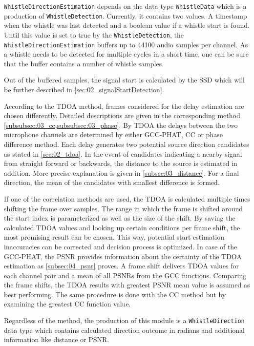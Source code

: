 \lstinline!WhistleDirectionEstimation! depends on the data type \lstinline!WhistleData!
which is a production of \lstinline!WhistleDetection!.
Currently, it contains two values. A timestamp when the whistle was last detected
and a boolean value if a whistle start is found.
Until this value is set to true by the \lstinline!WhistleDetection!, the
\lstinline!WhistleDirectionEstimation! buffers up to
44100 audio samples per channel.
As a whistle needs to be detected for multiple cycles in a short time, one can
be sure that the buffer contains a number of whistle samples.

Out of the buffered samples, the signal start is calculated by the \ac{SSD}
which will be further described in \cref{sec:02_signalStartDetection}.

According to the \ac{TDOA} method, frames considered for the delay estimation
are chosen differently.
Detailed descriptions are given in the corresponding method
\cref{subsubsec:03_cc,subsubsec:03_phase}.
By \ac{TDOA} the delays between the two microphone channels are
determined by either \ac{GCC-PHAT}, \ac{CC} or phase difference method.
Each delay generates two potential source direction candidates as stated
in \cref{sec:02_tdoa}.
In the event of candidates indicating a nearby signal from straight forward or
backwards, the distance to the source is estimated in addition.
More precise explanation is given in \cref{subsec:03_distance}.
For a final direction, the mean of the candidates with smallest difference
is formed.

If one of the correlation methods are used, the \ac{TDOA} is calculated
multiple times shifting the frame over samples.
The range in which the frame is shifted around the start index is parameterized
as well as the size of the shift.
By saving the calculated \ac{TDOA} values and looking up certain conditions per frame shift,
the most promising result can be chosen.
This way, potential start estimation inaccuracies can be corrected and
decision process is optimized.
In case of the \ac{GCC-PHAT}, the \ac{PSNR} provides information about
the certainty of the \ac{TDOA} estimation as \cref{subsec:04_psnr} proves.
A frame shift delivers \ac{TDOA} values for each channel pair and a
mean of all \acp{PSNR} from the \ac{GCC} functions.
Comparing the frame shifts, the \ac{TDOA} results with
greatest \ac{PSNR} mean value is assumed as best performing.
The same procedure is done with the \ac{CC} method but by examining
the greatest \ac{CC} function value.

Regardless of the method, the production of this module is a
\lstinline!WhistleDirection! data type which contains calculated
direction outcome in radians and additional information like distance or \ac{PSNR}.


